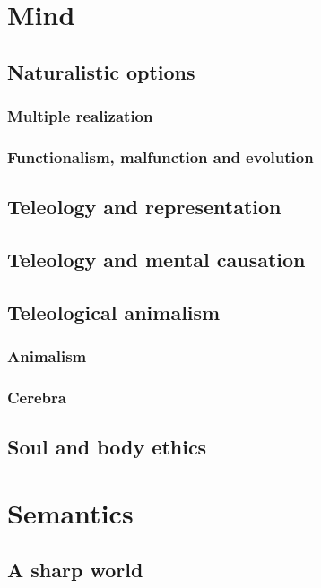 \def\mychapter{VI}

\chapter{Mind}\label{ch:mind}
\section{Naturalistic options}
\subsection{Multiple realization}
\subsection{Functionalism, malfunction and evolution}
\section{Teleology and representation}
\section{Teleology and mental causation}
\section{Teleological animalism}
\subsection{Animalism}
\subsection{Cerebra}
\section{Soul and body ethics}
\chaptertail 

\def\mychapter{VII}

\chapter{Semantics}\label{ch:semantics}
\section{A sharp world}
\chaptertail

\def\mychapter{VIII}

